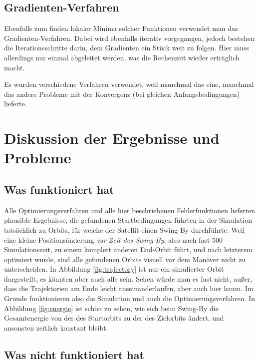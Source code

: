 \subsection{Gradienten-Verfahren}

Ebenfalls zum finden lokaler Minima solcher Funktionen verwendet man das Gradienten-Verfahren. Dabei wird ebenfalls iterativ vorgegangen, jedoch bestehen die Iterationsschritte darin, dem Gradienten ein Stück weit zu folgen. Hier muss allerdings nur einmal abgeleitet werden, was die Rechenzeit wieder erträglich macht.

\vspace{1.5cm}

Es wurden verschiedene Verfahren verwendet, weil manchmal das eine, manchmal das andere Probleme mit der Konvergenz (bei gleichen Anfangsbedingungen) lieferte.

\section{Diskussion der Ergebnisse und Probleme}

\subsection{Was funktioniert hat}

Alle Optimierungsverfahren und alle hier beschriebenen Fehlerfunktionen lieferten plausible Ergebnisse, die gefundenen Startbedingungen führten in der Simulation tatsächlich zu Orbits, für welche der Satellit einen Swing-By durchführte. Weil eine kleine Positionsänderung \textit{zur Zeit des Swing-By}, also nach fast 500 Simulationszeit, zu einem komplett anderen End-Orbit führt, und nach letzterem optimiert wurde, sind alle gefundenen Orbits visuell vor dem Manöver nicht zu unterscheiden. In Abbildung \ref{fig:trajectory} ist nur ein simulierter Orbit dargestellt, es könnten aber auch alle sein. Sehen würde man es fast nicht, außer, dass die Trajektorien am Ende leicht auseinanderlaufen, aber auch hier kaum. Im Grunde funktionieren also die Simulation und auch die Optimierungsverfahren. In Abbildung \ref{fig:energie} ist schön zu sehen, wie sich beim Swing-By die Gesamtenergie von der des Startorbits zu der des Zielorbits ändert, und ansonsten zeitlich konstant bleibt.


\subsection{Was nicht funktioniert hat}

